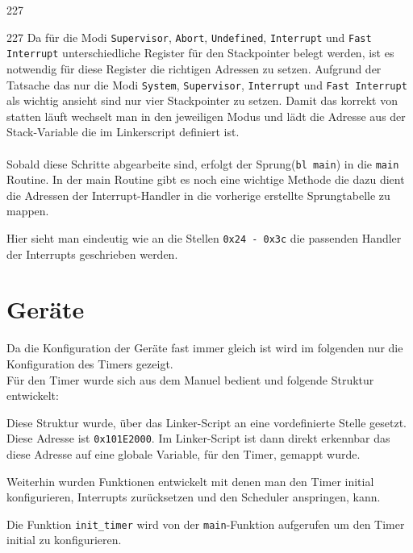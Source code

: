 \begin{dinglist}{227}
\begin{dinglist}{227}
Da f\"ur die Modi \texttt{Supervisor}, \texttt{Abort}, \texttt{Undefined}, \texttt{Interrupt} und \texttt{Fast Interrupt} unterschiedliche Register f\"ur den Stackpointer belegt werden, ist es notwendig f\"ur diese Register die richtigen Adressen zu setzen. Aufgrund der Tatsache das \mops nur die Modi \texttt{System}, \texttt{Supervisor}, \texttt{Interrupt} und \texttt{Fast Interrupt} als wichtig ansieht sind nur vier Stackpointer zu setzen. Damit das korrekt von statten l\"auft wechselt man in den jeweiligen Modus und l\"adt die Adresse aus der  Stack-Variable die im Linkerscript definiert ist.\\\\
Sobald diese Schritte abgearbeite sind, erfolgt der Sprung(\texttt{bl main}) in die \texttt{main} Routine.
In der main Routine gibt es noch eine wichtige Methode die dazu dient die Adressen der Interrupt-Handler in die vorherige erstellte Sprungtabelle zu mappen.
 
Hier sieht man eindeutig wie an die Stellen \texttt{0x24 - 0x3c} die passenden Handler der Interrupts geschrieben werden. 
\end{dinglist}
\end{dinglist} 
\section{Ger\"ate}
Da die Konfiguration der Ger\"ate fast immer gleich ist wird im folgenden nur die Konfiguration des Timers gezeigt. \\
F\"ur den Timer wurde sich aus dem Manuel\parencite[vgl. Tabelle 3-1][34]{timerRef} bedient und folgende Struktur entwickelt:
 
Diese Struktur wurde, \"uber das Linker-Script an eine vordefinierte Stelle gesetzt. Diese Adresse ist \texttt{0x101E2000}\parencite[vgl. Tabelle 4-72][262]{archManI}. Im Linker-Script ist dann direkt erkennbar das diese Adresse auf eine globale Variable, f\"ur den Timer, gemappt wurde.

Weiterhin wurden Funktionen entwickelt mit denen man den Timer initial  konfigurieren, Interrupts zur\"ucksetzen und den Scheduler anspringen, kann.

Die Funktion \texttt{init\_timer} wird von der \texttt{main}-Funktion aufgerufen um den Timer initial zu konfigurieren.
